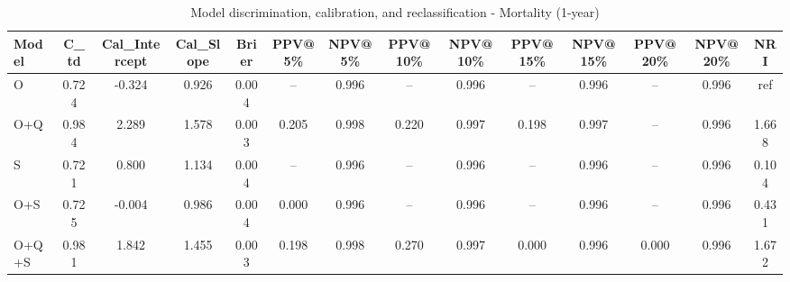 \begin{table}[htbp]
\centering
\small
\caption{Model discrimination, calibration, and reclassification - Mortality (1-year)}
\label{tab:perf_mortality_1y}
\begin{tabular}{lccccccccccccc}
\toprule
Model & C\_td & Cal\_Intercept & Cal\_Slope & Brier & PPV@5\% & NPV@5\% & PPV@10\% & NPV@10\% & PPV@15\% & NPV@15\% & PPV@20\% & NPV@20\% & NRI \\
\midrule
O & 0.724 & -0.324 & 0.926 & 0.004 & -- & 0.996 & -- & 0.996 & -- & 0.996 & -- & 0.996 & ref \\
O+Q & 0.984 & 2.289 & 1.578 & 0.003 & 0.205 & 0.998 & 0.220 & 0.997 & 0.198 & 0.997 & -- & 0.996 & 1.668 \\
S & 0.721 & 0.800 & 1.134 & 0.004 & -- & 0.996 & -- & 0.996 & -- & 0.996 & -- & 0.996 & 0.104 \\
O+S & 0.725 & -0.004 & 0.986 & 0.004 & 0.000 & 0.996 & -- & 0.996 & -- & 0.996 & -- & 0.996 & 0.431 \\
O+Q+S & 0.981 & 1.842 & 1.455 & 0.003 & 0.198 & 0.998 & 0.270 & 0.997 & 0.000 & 0.996 & 0.000 & 0.996 & 1.672 \\
\bottomrule
\end{tabular}
\end{table}